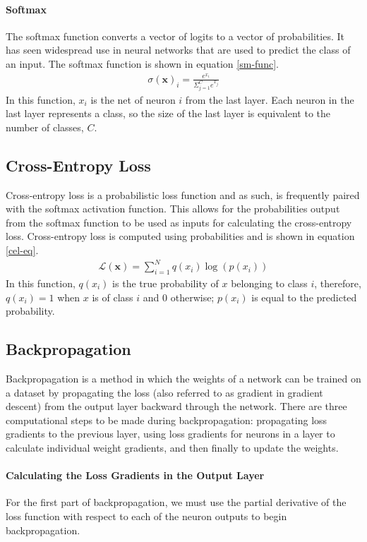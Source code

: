 \paragraph{Softmax}
The softmax function converts a vector of logits to a vector of probabilities. It has seen widespread use in neural networks that are used to predict the class of an input. The softmax function is shown in equation \ref{sm-func}.
\begin{align}
\sigma(\mathbf{x})_i = \frac{e^{x_i}}{\Sigma_{j=1}^C e^{x_j}} \label{sm-func}
\end{align}
In this function, $x_i$ is the net of neuron $i$ from the last layer. Each neuron in the last layer represents a class, so the size of the last layer is equivalent to the number of classes, $C$. 


\subsection{Cross-Entropy Loss}
Cross-entropy loss is a probabilistic loss function and as such, is frequently paired with the softmax activation function. This allows for the probabilities output from the softmax function to be used as inputs for calculating the cross-entropy loss. Cross-entropy loss is computed using probabilities and is shown in equation \ref{cel-eq}.
\begin{align}
\mathcal{L}(\mathbf{x}) = \sum_{i=1}^{N} q(x_i)\log(p(x_i))\label{cel-eq}
\end{align}
In this function, $q(x_i)$ is the true probability of $x$ belonging to class $i$, therefore, $q(x_i) = 1$ when $x$ is of class $i$ and $0$ otherwise; $p(x_i)$ is equal to the predicted probability.

\subsection{Backpropagation}\label{backprop}
Backpropagation is a method in which the weights of a network can be trained on a dataset by propagating the loss (also referred to as gradient in gradient descent) from the output layer backward through the network. There are three computational steps to be made during backpropagation: propagating loss gradients to the previous layer, using loss gradients for neurons in a layer to calculate individual weight gradients, and then finally to update the weights.

\paragraph{Calculating the Loss Gradients in the Output Layer}
For the first part of backpropagation, we must use the partial derivative of the loss function with respect to each of the neuron outputs to begin backpropagation.


